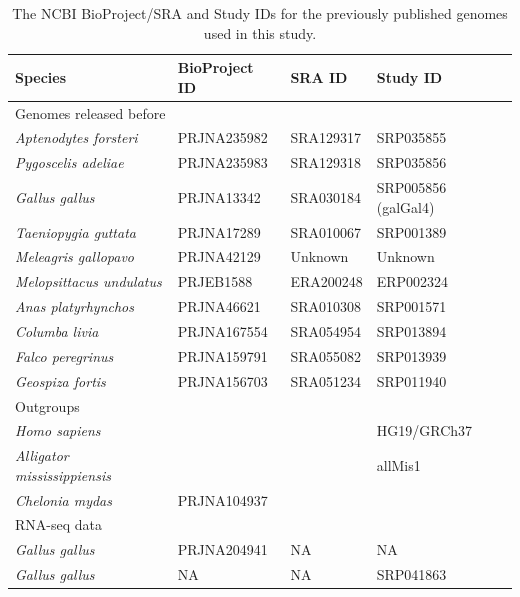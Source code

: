 \documentclass[10pt]{bmc_article}
\newenvironment{bmcformat}{\begin{raggedright}\baselineskip20pt\sloppy\setboolean{publ}{false}}{\end{raggedright}\baselineskip20pt\sloppy}
\begin{document}
\begin{bmcformat}
\begin{table}[h!]
  \begin{center}
    \begin{tabular}{|l|l|l|l|}
    \hline
Species & BioProject ID & SRA ID & Study ID \\
    \hline
\multicolumn{4}{|l|}{Genomes released before}\\
\hline
\emph{Aptenodytes forsteri} & PRJNA235982 & SRA129317 & SRP035855\\
\emph{Pygoscelis adeliae} & PRJNA235983 & SRA129318 & SRP035856\\
\emph{Gallus gallus} & PRJNA13342 & SRA030184 & SRP005856 (galGal4)\\
\emph{Taeniopygia guttata} & PRJNA17289 & SRA010067 & SRP001389\\
\emph{Meleagris gallopavo} & PRJNA42129 & Unknown & Unknown\\
\emph{Melopsittacus undulatus} & PRJEB1588 & ERA200248 & ERP002324\\
\emph{Anas platyrhynchos} & PRJNA46621 & SRA010308 & SRP001571\\
\emph{Columba livia} & PRJNA167554 & SRA054954 & SRP013894\\
\emph{Falco peregrinus} & PRJNA159791 & SRA055082 & SRP013939\\
\emph{Geospiza fortis} & PRJNA156703 & SRA051234 & SRP011940\\
\hline
\multicolumn{4}{|l|}{Outgroups}\\
\hline
\emph{Homo sapiens} & & & HG19/GRCh37\\
\emph{Alligator mississippiensis} & & & allMis1\\
\emph{Chelonia mydas} & PRJNA104937 & & \\
\hline
\multicolumn{4}{|l|}{RNA-seq data}\\
\hline
\emph{Gallus gallus} & PRJNA204941 & NA & NA \\
\emph{Gallus gallus} & NA & NA & SRP041863 \\
\hline
    \end{tabular}
  \end{center}
  \caption{The NCBI BioProject/SRA and Study IDs for the previously
    published genomes used in this study.}
\end{table}


{
  } %



\end{bmcformat}
\end{document}
